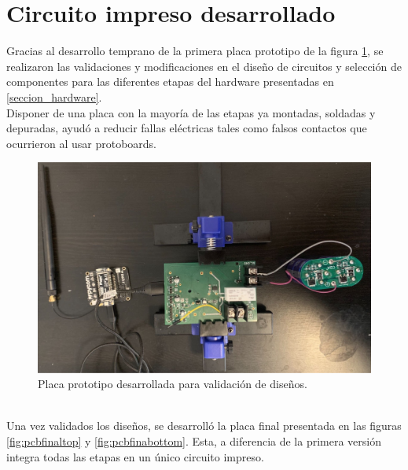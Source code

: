 \section{Circuito impreso desarrollado}
\label{sec:pruebasHW}
Gracias al desarrollo temprano de la primera placa prototipo de la figura \ref{fig:placaprototipo}, se realizaron las validaciones y modificaciones en el diseño de circuitos y selección de componentes para las diferentes etapas del hardware presentadas en \ref{seccion_hardware}.\\
Disponer de una placa con la mayoría de las etapas ya montadas, soldadas y depuradas, ayudó a reducir fallas eléctricas tales como falsos contactos que ocurrieron al usar protoboards.\\
\begin{figure}[h]
	\centering
	\includegraphics[width=0.7\linewidth]{Figures/placa_prototipo}
	\caption{Placa prototipo desarrollada para validación de diseños.}
	\label{fig:placaprototipo}
\end{figure}\\
Una vez validados los diseños, se desarrolló la placa final presentada en las figuras \ref{fig:pcbfinaltop} y \ref{fig:pcbfinabottom}. Esta, a diferencia de la primera versi\'{o}n integra todas las etapas en un único circuito impreso.\\
